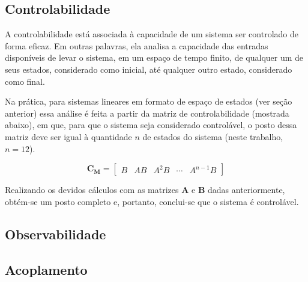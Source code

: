 \subsection{Controlabilidade}
A controlabilidade está associada à capacidade de um sistema ser controlado de forma eficaz. Em outras palavras, ela 
analisa a capacidade das entradas disponíveis de levar o sistema, em um espaço de tempo finito, de qualquer um de seus 
estados, considerado como inicial, até qualquer outro estado, considerado como final.

Na prática, para sistemas lineares em formato de espaço de estados (ver seção anterior) essa análise é feita a 
partir da matriz de controlabilidade (mostrada abaixo), em que, para que o sistema 
seja considerado controlável, o posto dessa matriz deve ser igual à quantidade $n$ de estados do sistema (neste trabalho, 
$n=12$).

\begin{equation*}
    \mathbf{C_M} = \begin{bmatrix}
    B & AB & A^2B & \cdots & A^{n-1}B
    \end{bmatrix}
\end{equation*}

Realizando os devidos cálculos com as matrizes $\mathbf{A}$ e $\mathbf{B}$ dadas anteriormente, obtém-se um posto 
completo e, portanto, conclui-se que o sistema é controlável.

\subsection{Observabilidade}
\lipsum[1]

\subsection{Acoplamento}
\lipsum[1]